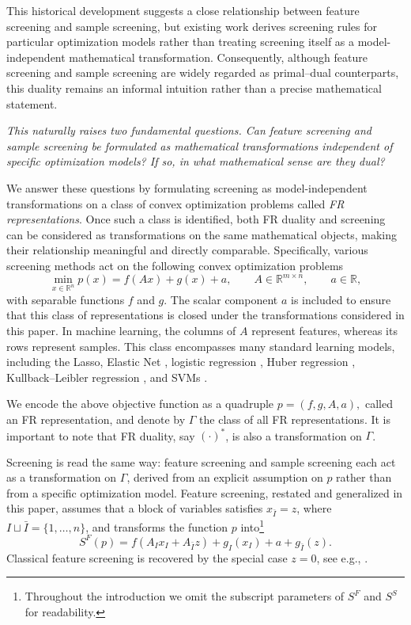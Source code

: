 This historical development suggests a close relationship between feature screening and sample screening, but existing work derives screening rules for particular optimization models rather than treating screening itself as a model-independent mathematical transformation. Consequently, although feature screening and sample screening are widely regarded as primal--dual counterparts, this duality remains an informal intuition rather than a precise mathematical statement.

\begin{center}
\emph{This naturally raises two fundamental questions. Can feature
screening and sample screening be formulated as mathematical
transformations independent of specific optimization models? If so, in
what mathematical sense are they dual?}
\end{center}


We answer these questions by formulating screening as
model-independent transformations on a class of convex optimization problems called \emph{FR representations}.
Once such a class is identified, both
FR duality and screening can be considered as transformations on the same mathematical objects, making their relationship meaningful and directly comparable.
Specifically, various screening methods act on the following convex optimization problems
\[
    \min_{x\in\mathbb R^n}
    p(x)=f(Ax)+g(x)+a,
    \qquad
    A\in\mathbb R^{m\times n},
    \qquad
    a\in\mathbb R,
\]
with separable functions \(f\) and \(g\). The scalar component \(a\) is included to ensure that this class of representations is closed under the transformations considered in this paper.
In machine learning, the columns of \(A\) represent features, whereas
its rows represent samples.
This class encompasses many standard learning models, including the Lasso, Elastic Net \citep{guyard2022screen}, logistic regression \citep{wang2014safe}, Huber regression \citep{chen2020safe}, Kullback--Leibler regression \citep{dantas2021safe}, and SVMs \citep{zhai2020safe,nguyen2026gap}.



We encode the above objective function as a quadruple
\(
p=(f,g,A,a),
\)
called an FR representation, and denote by
\(\Gamma\) the class of all FR representations.
It is important to note that FR duality, say \((\cdot)^*\), is also a transformation on \(\Gamma\).

Screening is read the same way: feature screening and sample
screening each act as a transformation on \(\Gamma\), derived from an
explicit assumption on \(p\) rather than from a specific optimization
model. Feature screening, restated and generalized in this paper, assumes
that a block of variables satisfies \(x_{\bar I}=z\), where
\(I\sqcup\bar I=\{1,\ldots,n\}\), and transforms the function \(p\)
into\footnote{Throughout the introduction we omit the subscript
parameters of \(S^F\) and \(S^S\) for readability.}
\[
    S^F(p)
    =
    f(A_Ix_I+A_{\bar I}z)
    +g_I(x_I)
    +a
    +g_{\bar I}(z).
\]
Classical feature screening is recovered by the special case
\(z=0\), see e.g., \citep{elghaoui2010}.

